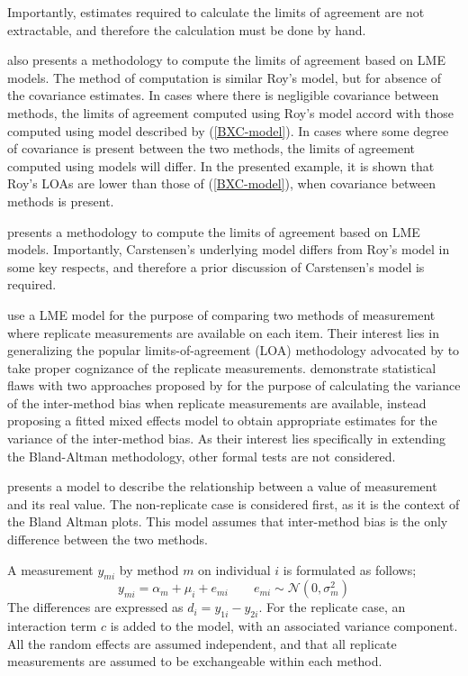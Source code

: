 \documentclass[12pt, a4paper]{report}
\theoremstyle{plain}
\theoremstyle{definition}
\theoremstyle{remark}
\begin{document}
Importantly, estimates required to calculate the limits of agreement are not extractable, and therefore the calculation must be done by hand.



\citet{BXC2008} also presents a methodology to compute the limits of agreement based on LME models. The method of computation is similar Roy's model, but for absence of the covariance estimates. In cases where there is negligible covariance between methods, the limits of agreement computed using Roy's model accord with those computed using model described by (\ref{BXC-model}). In cases where some degree of covariance is present between the two methods, the limits of agreement computed using models will differ. In the presented example, it is shown that Roy's LOAs are lower than those of (\ref{BXC-model}), when covariance between methods is present.

\citet{BXC2008} presents a methodology to compute the limits of
agreement based on LME models. Importantly, Carstensen's underlying model differs from Roy's model in some key respects, and therefore a prior discussion of Carstensen's model is required.

\citet{BXC2008} use a LME model for the purpose of comparing two methods of measurement where replicate measurements are available on each item. Their interest lies in generalizing the popular limits-of-agreement (LOA) methodology advocated by \citet{BA86} to take proper cognizance of the replicate measurements. \citet{BXC2008} demonstrate statistical flaws with two approaches proposed by \citet{BA99} for the purpose of calculating the variance of the inter-method bias when replicate measurements are available, instead proposing a fitted mixed effects model to obtain appropriate estimates for the variance of the inter-method bias.  As their interest lies specifically in extending the Bland-Altman methodology, other formal tests are not considered.

\citet{BXC2004} presents a model to describe the relationship between a value of measurement and its
real value. The non-replicate case is considered first, as it is the context of the Bland Altman plots. This model assumes that inter-method bias is the only difference between the two methods.

A measurement $y_{mi}$ by method $m$ on individual $i$ is formulated as follows;
\begin{equation}
y_{mi}  = \alpha_{m} + \mu_{i} + e_{mi} \qquad  e_{mi} \sim
\mathcal{N}(0,\sigma^{2}_{m})
\end{equation}
The differences are expressed as $d_{i} = y_{1i} - y_{2i}$. For the replicate case, an interaction term $c$ is added to the model, with an associated variance component. All the random effects are assumed independent, and that all replicate measurements are assumed to be exchangeable within each method.
\end{document}
